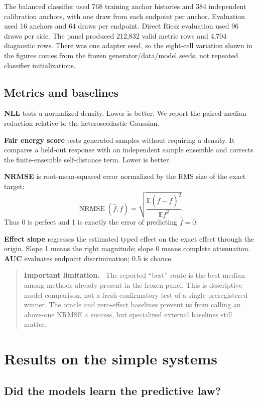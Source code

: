 \documentclass[11pt]{article}
\newcommand{\E}{\mathbb{E}}
\newcommand{\nrmse}{\operatorname{NRMSE}}
\newenvironment{warningbox}
  {\begin{quote}\color{sidred}\textbf{Important limitation.}\ }
  {\end{quote}}
\begin{document}
The balanced classifier used 768 training anchor histories and 384 independent
calibration anchors, with one draw from each endpoint per anchor.  Evaluation used 16
anchors and 64 draws per endpoint.  Direct Riesz evaluation used 96 draws per side.
The panel produced 212,832 valid metric rows and 4,704 diagnostic rows.  There was one
adapter seed, so the eight-cell variation shown in the figures comes from the frozen
generator/data/model seeds, not repeated classifier initializations.

\subsection{Metrics and baselines}

\textbf{NLL} tests a normalized density.  Lower is better.  We report the paired
median reduction relative to the heteroscedastic Gaussian.

\textbf{Fair energy score} tests generated samples without requiring a density.  It
compares a held-out response with an independent sample ensemble and corrects the
finite-ensemble self-distance term.  Lower is better.

\textbf{NRMSE} is root-mean-squared error normalized by the RMS size of the exact
target:
\[
  \nrmse(\widehat f,f)=
  \sqrt{\frac{\E(\widehat f-f)^2}{\E f^2}}.
\]
Thus 0 is perfect and 1 is exactly the error of predicting $\widehat f=0$.

\textbf{Effect slope} regresses the estimated typed effect on the exact effect through
the origin.  Slope 1 means the right magnitude; slope 0 means complete attenuation.
\textbf{AUC} evaluates endpoint discrimination; 0.5 is chance.

\begin{warningbox}
The reported ``best'' route is the best median among methods already present in the
frozen panel.  This is descriptive model comparison, not a fresh confirmatory test of
a single preregistered winner.  The oracle and zero-effect baselines prevent us from
calling an above-one NRMSE a success, but specialized external baselines still matter.
\end{warningbox}

\section{Results on the simple systems}

\subsection{Did the models learn the predictive law?}
\end{document}
